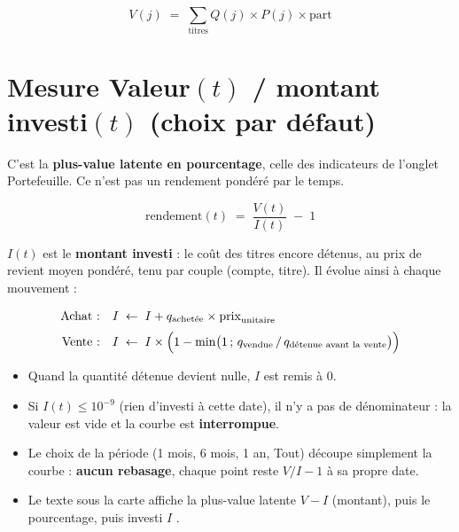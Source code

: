 \documentclass[11pt,a4paper]{article}
\begin{document}
\begin{formules}
\[
V(j)\;=\;\sum_{\text{titres}} Q(j)\times P(j)\times \mathrm{part}
\]
\end{formules}

\section{Mesure \og Valeur$(t)$ / montant investi$(t)$ \fg{} (choix par défaut)}

C'est la \textbf{plus-value latente en pourcentage}, celle des indicateurs de l'onglet Portefeuille. Ce n'est pas un
rendement pondéré par le temps.

\begin{formules}
\[
\boxed{\;\mathrm{rendement}(t)\;=\;\frac{V(t)}{I(t)}\;-\;1\;}
\]
\end{formules}

$I(t)$ est le \textbf{montant investi} : le coût des titres encore détenus, au prix de revient moyen pondéré, tenu par
couple (compte, titre). Il évolue ainsi à chaque mouvement :

\begin{formules}
\begin{align*}
\text{Achat :}\quad & I \;\leftarrow\; I + q_{\text{achetée}}\times \mathrm{prix}_{\text{unitaire}}\\[2pt]
\text{Vente :}\quad & I \;\leftarrow\; I\times\Bigl(1-\min\bigl(1\,;\,q_{\text{vendue}}\,/\,q_{\text{détenue avant la vente}}\bigr)\Bigr)
\end{align*}
\end{formules}

\begin{itemize}
  \item Quand la quantité détenue devient nulle, $I$ est remis à $0$.
  \item Si $I(t)\le 10^{-9}$ (rien d'investi à cette date), il n'y a pas de dénominateur : la valeur est \og vide \fg{}
        et la courbe est \textbf{interrompue}.
  \item Le choix de la période (1 mois, 6 mois, 1 an, Tout) découpe simplement la courbe : \textbf{aucun rebasage},
        chaque point reste $V/I-1$ à sa propre date.
  \item Le texte sous la carte affiche la plus-value latente $V-I$ (montant), puis le pourcentage, puis
        \og investi $I$ \fg.
\end{itemize}
\end{document}
